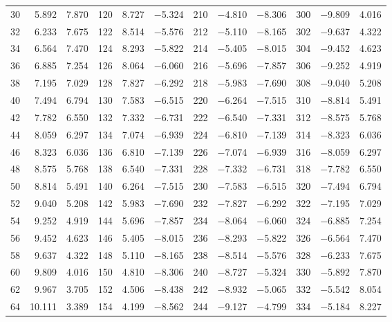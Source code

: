 \begin{table}[!h]
{\begin{tabular}{rrr|rrr|rrr|rrr}
 30 &   5.892 &  7.870 & 120 &   8.727 & $-$5.324 & 210 &  $-$4.810 & $-$8.306 & 300 &  $-$9.809 &  4.016\\
 32 &   6.233 &  7.675 & 122 &   8.514 & $-$5.576 & 212 &  $-$5.110 & $-$8.165 & 302 &  $-$9.637 &  4.322\\
 34 &   6.564 &  7.470 & 124 &   8.293 & $-$5.822 & 214 &  $-$5.405 & $-$8.015 & 304 &  $-$9.452 &  4.623\\
 36 &   6.885 &  7.254 & 126 &   8.064 & $-$6.060 & 216 &  $-$5.696 & $-$7.857 & 306 &  $-$9.252 &  4.919\\
 38 &   7.195 &  7.029 & 128 &   7.827 & $-$6.292 & 218 &  $-$5.983 & $-$7.690 & 308 &  $-$9.040 &  5.208\\
 40 &   7.494 &  6.794 & 130 &   7.583 & $-$6.515 & 220 &  $-$6.264 & $-$7.515 & 310 &  $-$8.814 &  5.491\\
 42 &   7.782 &  6.550 & 132 &   7.332 & $-$6.731 & 222 &  $-$6.540 & $-$7.331 & 312 &  $-$8.575 &  5.768\\
 44 &   8.059 &  6.297 & 134 &   7.074 & $-$6.939 & 224 &  $-$6.810 & $-$7.139 & 314 &  $-$8.323 &  6.036\\
 46 &   8.323 &  6.036 & 136 &   6.810 & $-$7.139 & 226 &  $-$7.074 & $-$6.939 & 316 &  $-$8.059 &  6.297\\
 48 &   8.575 &  5.768 & 138 &   6.540 & $-$7.331 & 228 &  $-$7.332 & $-$6.731 & 318 &  $-$7.782 &  6.550\\
 50 &   8.814 &  5.491 & 140 &   6.264 & $-$7.515 & 230 &  $-$7.583 & $-$6.515 & 320 &  $-$7.494 &  6.794\\
 52 &   9.040 &  5.208 & 142 &   5.983 & $-$7.690 & 232 &  $-$7.827 & $-$6.292 & 322 &  $-$7.195 &  7.029\\
 54 &   9.252 &  4.919 & 144 &   5.696 & $-$7.857 & 234 &  $-$8.064 & $-$6.060 & 324 &  $-$6.885 &  7.254\\
 56 &   9.452 &  4.623 & 146 &   5.405 & $-$8.015 & 236 &  $-$8.293 & $-$5.822 & 326 &  $-$6.564 &  7.470\\
 58 &   9.637 &  4.322 & 148 &   5.110 & $-$8.165 & 238 &  $-$8.514 & $-$5.576 & 328 &  $-$6.233 &  7.675\\
 60 &   9.809 &  4.016 & 150 &   4.810 & $-$8.306 & 240 &  $-$8.727 & $-$5.324 & 330 &  $-$5.892 &  7.870\\
 62 &   9.967 &  3.705 & 152 &   4.506 & $-$8.438 & 242 &  $-$8.932 & $-$5.065 & 332 &  $-$5.542 &  8.054\\
 64 &  10.111 &  3.389 & 154 &   4.199 & $-$8.562 & 244 &  $-$9.127 & $-$4.799 & 334 &  $-$5.184 &  8.227\\

\end{tabular}}
\end{table}

